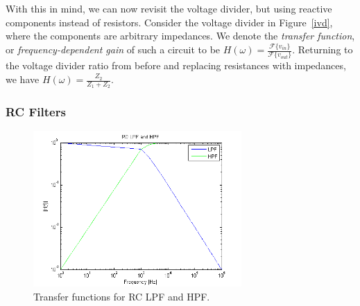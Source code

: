 \documentclass[11pt]{article}
\begin{document}
        \noindent With this in mind, we can now revisit the voltage divider, but using reactive components instead of resistors. Consider the voltage divider in Figure~\ref{ivd}, where the components are arbitrary impedances. We denote the \emph{transfer function}, or \emph{frequency-dependent gain} of such a circuit to be $H(\omega) = \frac{\mathcal{F}\{v_{in}\}}{\mathcal{F}\{v_{out}\}}$. Returning to the voltage divider ratio from before and replacing resistances with impedances, we have $H(\omega) = \frac{Z_2}{Z_1 + Z_2}$.

        \subsubsection{RC Filters}
        
        \begin{figure}[H]
            \centering
                \includegraphics[width = 300px]{rc_matlab.png}
            \caption{Transfer functions for RC LPF and HPF.}
            \label{rcf}
        \end{figure}
        
\end{document}

